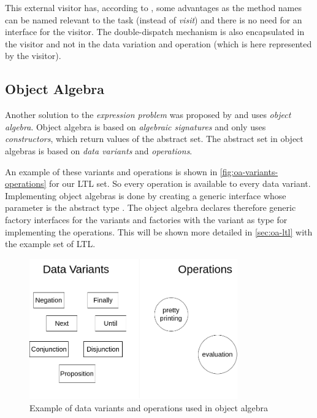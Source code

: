 \documentclass{llncs}
\begin{document}
This external visitor has, according to \cite{Parr09}, some advantages as the method names can be named relevant to the task (instead of \emph{visit}) and there is no need for an interface for the visitor. The double-dispatch mechanism is also encapsulated in the visitor and not in the data variation and operation (which is here represented by the visitor). 


\subsection{Object Algebra} \label{ssec:oa}
Another solution to the \emph{expression problem} was proposed by \cite{Oliveira12} and uses \emph{object algebra}. Object algebra is based on \emph{algebraic signatures} \cite{Guttag78} and only uses \emph{constructors}, which return values of the abstract set. The abstract set in object algebras is based on \emph{data variants} and \emph{operations}. 

An example of these variants and operations is shown in \autoref{fig:oa-variants-operations} for our LTL set. So every operation is available to every data variant. Implementing object algebras is done by creating a generic interface whose parameter is the abstract type \cite{Oliveira12}. The object algebra declares therefore generic factory interfaces for the variants and factories with the variant as type for implementing the operations. This will be shown more detailed in \autoref{sec:oa-ltl} with the example set of LTL.

\begin{figure}[h]
	\centering
	\includegraphics[width=0.8\textwidth]{img/OA-Variants-Operations}
	\caption{Example of data variants and operations used in object algebra}
	\label{fig:oa-variants-operations}
\end{figure} 
\end{document}
